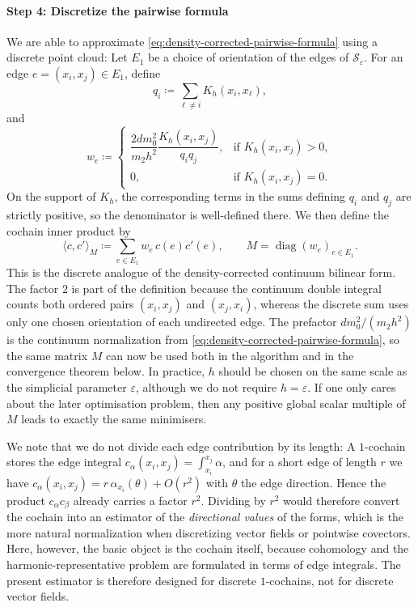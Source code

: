 \documentclass[a4paper,11pt, DIV=10]{scrartcl}
\numberwithin{equation}{section}
\theoremstyle{definition}
\theoremstyle{remark}
\newcommand{\mc}[1]{\mathcal{#1}}
\DeclareMathOperator{\diag}{diag}
\begin{document}
\paragraph{Step 4: Discretize the pairwise formula}
We are able to approximate \cref{eq:density-corrected-pairwise-formula} using a discrete point cloud: Let $E_1$ be a choice of orientation of the edges of $\mc{S}_\varepsilon$. For an edge $e=(x_i,x_j)\in E_1$, define
\begin{equation}
q_i\coloneq \sum_{\ell\neq i} K_h(x_i,x_\ell),
\end{equation}
and
\begin{equation}
w_e\coloneq
\begin{cases}
\dfrac{2dm_0^2}{m_2h^2}\dfrac{K_h(x_i,x_j)}{q_iq_j}, & \text{if } K_h(x_i,x_j)>0,\\[0.8ex]
0, & \text{if } K_h(x_i,x_j)=0.
\end{cases}
\end{equation}
On the support of $K_h$, the corresponding terms in the sums defining $q_i$ and $q_j$ are strictly positive, so the denominator is well-defined there.
We then define the cochain inner product by
\begin{equation}
\langle c,c'\rangle_M
\coloneq
\sum_{e\in E_1} w_e\,c(e)c'(e),
\qquad
M=\diag(w_e)_{e\in E_1}.
\end{equation}
This is the discrete analogue of the density-corrected continuum bilinear form. The factor $2$ is part of the definition because the continuum double integral counts both ordered pairs $(x_i,x_j)$ and $(x_j,x_i)$, whereas the discrete sum uses only one chosen orientation of each undirected edge. The prefactor $dm_0^2/(m_2h^2)$ is the continuum normalization from \cref{eq:density-corrected-pairwise-formula}, so the same matrix $M$ can now be used both in the algorithm and in the convergence theorem below. In practice, $h$ should be chosen on the same scale as the simplicial parameter $\varepsilon$, although we do not require $h=\varepsilon$. If one only cares about the later optimisation problem, then any positive global scalar multiple of $M$ leads to exactly the same minimisers.

We note that we do not divide each edge contribution by its length: A $1$-cochain stores the edge integral $c_\alpha(x_i,x_j)=\int_{x_i}^{x_j}\alpha$, and for a short edge of length $r$ we have $c_\alpha(x_i,x_j)=r\,\alpha_{x_i}(\theta)+O(r^2)$ with $\theta$ the edge direction. Hence the product $c_\alpha c_\beta$ already carries a factor $r^2$. Dividing by $r^2$ would therefore convert the cochain into an estimator of the \emph{directional values} of the forms, which is the more natural normalization when discretizing vector fields or pointwise covectors. Here, however, the basic object is the cochain itself, because cohomology and the harmonic-representative problem are formulated in terms of edge integrals.
The present estimator is therefore designed for discrete $1$-cochains, not for discrete vector fields.
\end{document}
